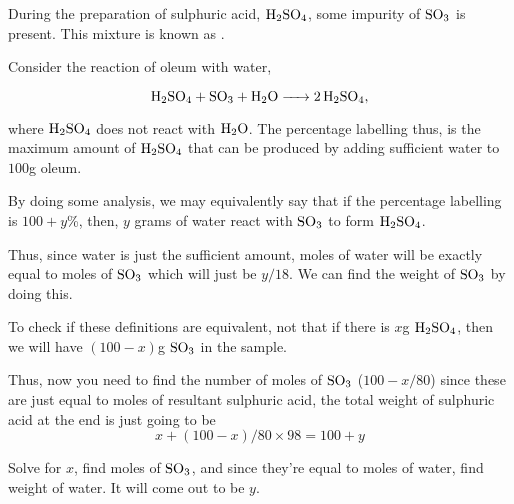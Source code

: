 During the preparation of sulphuric acid, \(\ce{H2SO4}\), some impurity of 
\(\ce{SO3}\) is present. This mixture is known as .

Consider the reaction of oleum with water, 

\begin{equation*}
  \ce{H2SO4 + SO3 + H2O -> 2H2SO4},
\end{equation*}

where \(\ce{H2SO4}\) does not react with \(\ce{H2O}\). The percentage labelling thus, is 
the maximum amount of \(\ce{H2SO4}\) that can be produced by adding sufficient water to \(100\)\si{\g} oleum.

By doing some analysis, we may equivalently say that if the percentage labelling is \(100 + y\)\%, then, 
\(y\) grams of water react with \(\ce{SO3}\) to form \(\ce{H2SO4}\).

Thus, since water is just the sufficient amount, moles of water will be exactly equal to 
moles of \(\ce{SO3}\) which will just be \(y/18\). We can find the weight of \(\ce{SO3}\) by 
doing this. 

To check if these definitions are equivalent, not that if there is \(x\)\si{\g}
\(\ce{H2SO4}\), then we will have \((100 - x)\)\si{\g} \(\ce{SO3}\) in the sample.

Thus, now you need to find the number of moles of \(\ce{SO3}\) (\(100 - x/80\)) since these 
are just equal to moles of resultant sulphuric acid, the total weight of sulphuric 
acid at the end is just going to be 
\begin{equation*}
  x + (100 - x)/80 \times 98 = 100 + y
\end{equation*}

Solve for \(x\), find moles of \(\ce{SO3}\), and since they're equal to moles of water, 
find weight of water. It will come out to be \(y\).